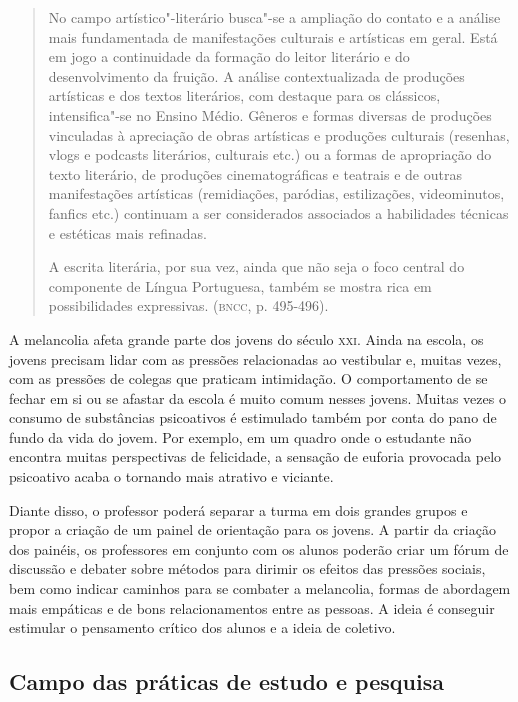 \documentclass{article}
\begin{document}
\begin{quote}
No campo artístico"-literário busca"-se a ampliação do contato e a
análise mais fundamentada de manifestações culturais e artísticas em
geral. Está em jogo a continuidade da formação do leitor literário e do
desenvolvimento da fruição. A análise contextualizada de produções
artísticas e dos textos literários, com destaque para os clássicos,
intensifica"-se no Ensino Médio. Gêneros e formas diversas de produções
vinculadas à apreciação de obras artísticas e produções culturais
(resenhas, vlogs e podcasts literários, culturais etc.) ou a formas de
apropriação do texto literário, de produções cinematográficas e teatrais
e de outras manifestações artísticas (remidiações, paródias,
estilizações, videominutos, fanfics etc.) continuam a ser considerados
associados a habilidades técnicas e estéticas mais refinadas.

A escrita literária, por sua vez, ainda que não seja o foco central do
componente de Língua Portuguesa, também se mostra rica em possibilidades
expressivas. (\textsc{bncc}, p. 495-496).
\end{quote}

A melancolia afeta grande parte dos jovens do século \textsc{xxi}. Ainda na
escola, os jovens precisam lidar com as pressões relacionadas ao
vestibular e, muitas vezes, com as pressões de colegas que praticam
intimidação. O comportamento de se fechar em si ou se afastar da
escola é muito comum nesses jovens. Muitas vezes o consumo de
substâncias psicoativos é estimulado também por conta do pano de fundo
da vida do jovem. Por exemplo, em um quadro onde o estudante não
encontra muitas perspectivas de felicidade, a sensação de euforia
provocada pelo psicoativo acaba o tornando mais atrativo e viciante.

Diante disso, o professor poderá separar a turma em dois grandes grupos
e propor a criação de um painel de orientação para os jovens. A partir
da criação dos painéis, os professores em conjunto com os alunos poderão
criar um fórum de discussão e debater sobre métodos para dirimir os
efeitos das pressões sociais, bem como indicar caminhos para se combater
a melancolia, formas de abordagem mais empáticas e de bons
relacionamentos entre as pessoas. A ideia é conseguir estimular o
pensamento crítico dos alunos e a ideia de coletivo.

\subsection{Campo das práticas de estudo e pesquisa}
\end{document}
